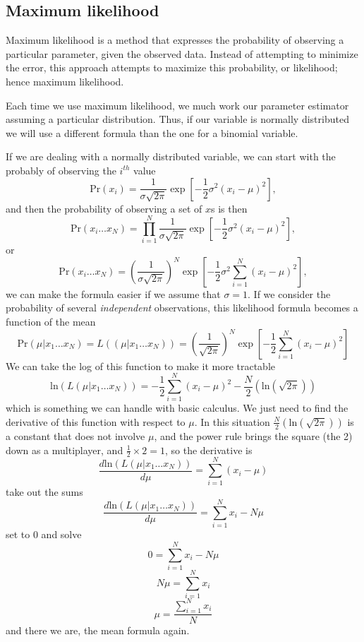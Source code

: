 \subsection{Maximum likelihood}
\label{sec:mimean}

Maximum likelihood is a method that expresses the probability of observing a particular parameter, given the observed data. Instead of attempting to minimize the error, this approach attempts to maximize this probability, or likelihood; hence maximum likelihood.

Each time we use maximum likelihood, we much work our parameter estimator assuming a particular distribution. Thus, if our variable is normally distributed we will use a different formula than the one for a binomial variable.

If we are dealing with a normally distributed variable, we can start with the probably of observing the $i^{th}$ value
\begin{equation}
\mbox{Pr}\left(x_i\right)=\frac{1}{\sigma\sqrt{2\pi}}\exp\left[-\frac{1}{2}\sigma^2\left(x_i-\mu\right)^2\right],
\end{equation}
and then the probability of observing a set of $x$s is then
\begin{equation}
\mbox{Pr}\left(x_i\ldots x_N\right)=\prod_{i=1}^N\frac{1}{\sigma\sqrt{2\pi}}\exp\left[-\frac{1}{2}\sigma^2\left(x_i-\mu\right)^2\right],
\end{equation}
or
\begin{equation}
\mbox{Pr}\left(x_i\ldots x_N\right)=\left(\frac{1}{\sigma\sqrt{2\pi}}\right)^N\exp\left[-\frac{1}{2}\sigma^2\sum_{i=1}^N\left(x_i-\mu\right)^2\right],
\end{equation}
we can make the formula easier if we assume that $\sigma= 1$. If we consider the probability of several {\it independent} observations, this likelihood formula becomes a function of the mean
\begin{equation}
\mbox{Pr}\left(\mu\vert x_1\ldots x_N\right)=L\left(\left(\mu\vert x_1\ldots x_N\right)\right)=\left(\frac{1}{\sqrt{2\pi}}\right)^N\exp\left[-\frac{1}{2}\sum_{i=1}^N\left(x_i-\mu\right)^2\right]
\end{equation}
We can take the log of this function to make it more tractable
\begin{equation}
\mbox{ln}\left(L\left(\mu\vert x_1\ldots x_N\right)\right)=-\frac{1}{2}\sum_{i=1}^N\left(x_i-\mu\right)^2-\frac{N}{2}\left(\mbox{ln}\left(\sqrt{2\pi}\right)\right)
\end{equation}
which is something we can handle with basic calculus. We just need to find the derivative of this function with respect to $\mu$. In this situation $\frac{N}{2}\left(\mbox{ln}\left(\sqrt{2\pi}\right)\right)$ is a constant that does not involve $\mu$, and the power rule brings the square (the 2) down as a multiplayer, and $\frac{1}{2}\times 2 = 1$, so the derivative is
\[
\frac{d\mbox{ln}\left(L\left(\mu\vert x_1\ldots x_N\right)\right)}{d\mu}=\sum_{i=1}^N\left(x_i-\mu\right)
\]
take out the sums
\[
\frac{d\mbox{ln}\left(L\left(\mu\vert x_1\ldots x_N\right)\right)}{d\mu}=\sum_{i=1}^Nx_i-N\mu
\]
set to 0 and solve
\[
0=\sum_{i=1}^Nx_i-N\mu
\]
\[
N\mu=\sum_{i=1}^Nx_i
\]
\[
\mu=\frac{\sum_{i=1}^Nx_i}{N}
\]
and there we are, the mean formula again.

